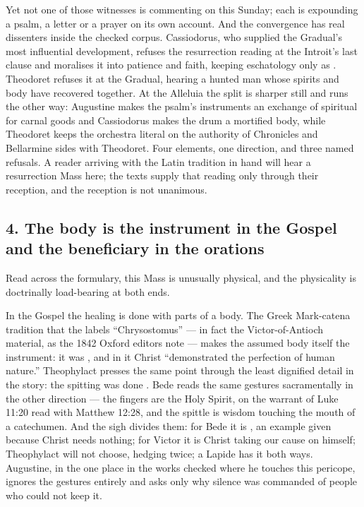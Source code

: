 Yet not one of those witnesses is commenting on this Sunday;
each is expounding a psalm, a letter or a prayer on its own account. And the
convergence has real dissenters inside the checked corpus. Cassiodorus, who
supplied the Gradual's most influential development, refuses the resurrection
reading at the Introit's last clause and moralises it into patience and faith,
keeping eschatology only as . Theodoret refuses it at the
Gradual, hearing a hunted man whose spirits and body have recovered together.
At the Alleluia the split is sharper still and runs the other way: Augustine
makes the psalm's instruments an exchange of spiritual for carnal goods and
Cassiodorus makes the drum a mortified body, while Theodoret keeps the
orchestra literal on the authority of Chronicles and Bellarmine sides with
Theodoret. Four elements, one direction, and three named refusals. A reader
arriving with the Latin tradition in hand will hear a resurrection Mass here; the texts supply that reading only through their
reception, and the reception is not unanimous.

\subsection*{4. The body is the instrument in the Gospel and the beneficiary in the orations}

Read across the formulary, this Mass is unusually physical, and the physicality
is doctrinally load-bearing at both ends.

In the Gospel the healing is done with parts of a body. The Greek Mark-catena
tradition that the  labels ``Chrysostomus'' --- in fact the
Victor-of-Antioch material, as the 1842 Oxford editors note --- makes the
assumed body itself the instrument: it was , and in it Christ ``demonstrated the perfection
of human nature.'' Theophylact presses the same point through the least dignified
detail in the story: the spitting was done . Bede reads the same gestures
sacramentally in the other direction --- the fingers are the Holy Spirit, on the
warrant of Luke 11:20 read with Matthew 12:28, and the spittle is wisdom
touching the mouth of a catechumen. And the sigh divides them: for Bede it is
, an example given because Christ needs nothing; for
Victor it is Christ taking our cause on himself; Theophylact will not choose,
hedging twice; a Lapide has it both ways. Augustine, in the one place in the
works checked where he touches this pericope, ignores the gestures entirely and
asks only why silence was commanded of people who could not keep it.

